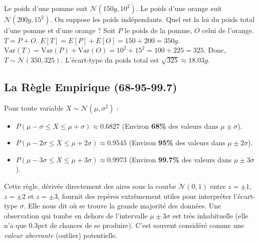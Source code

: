 \begin{examplebox}
Le poids d'une pomme suit $\mathcal{N}(150g, 10^2)$. Le poids d'une orange suit $\mathcal{N}(200g, 15^2)$. On suppose les poids indépendants. Quel est la loi du poids total d'une pomme et d'une orange ?
\newline
Soit $P$ le poids de la pomme, $O$ celui de l'orange. $T = P+O$.
\newline
$E[T] = E[P] + E[O] = 150 + 200 = 350g$.
\newline
$\text{Var}(T) = \text{Var}(P) + \text{Var}(O) = 10^2 + 15^2 = 100 + 225 = 325$.
\newline
Donc, $T \sim \mathcal{N}(350, 325)$. L'écart-type du poids total est $\sqrt{325} \approx 18.03g$.
\end{examplebox}

\subsection{La Règle Empirique (68-95-99.7)}

\begin{theorembox}
Pour toute variable $X \sim \mathcal{N}(\mu, \sigma^2)$ :
\begin{itemize}
    \item $P(\mu - \sigma \le X \le \mu + \sigma) \approx 0.6827$ (Environ \textbf{68\%} des valeurs dans $\mu \pm \sigma$).
    \item $P(\mu - 2\sigma \le X \le \mu + 2\sigma) \approx 0.9545$ (Environ \textbf{95\%} des valeurs dans $\mu \pm 2\sigma$).
    \item $P(\mu - 3\sigma \le X \le \mu + 3\sigma) \approx 0.9973$ (Environ \textbf{99.7\%} des valeurs dans $\mu \pm 3\sigma$).
\end{itemize}
\end{theorembox}

\begin{intuitionbox}
Cette règle, dérivée directement des aires sous la courbe $\mathcal{N}(0, 1)$ entre $z=\pm 1$, $z=\pm 2$ et $z=\pm 3$, fournit des repères extrêmement utiles pour interpréter l'écart-type $\sigma$. Elle nous dit où se trouve la grande majorité des données.
\newline
Une observation qui tombe en dehors de l'intervalle $\mu \pm 3\sigma$ est très inhabituelle (elle n'a que 0.3pct de chances de se produire). C'est souvent considéré comme une \textit{valeur aberrante} (outlier) potentielle.
\end{intuitionbox}

